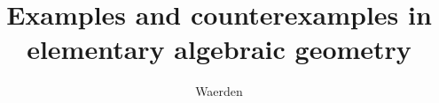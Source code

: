 \documentclass[../main.tex]{subfiles}
\begin{document}
\title[Examples and counterexamples in elementary algebraic geometry]{Examples and counterexamples in elementary algebraic geometry}
\author{Waerden}
\end{document}
